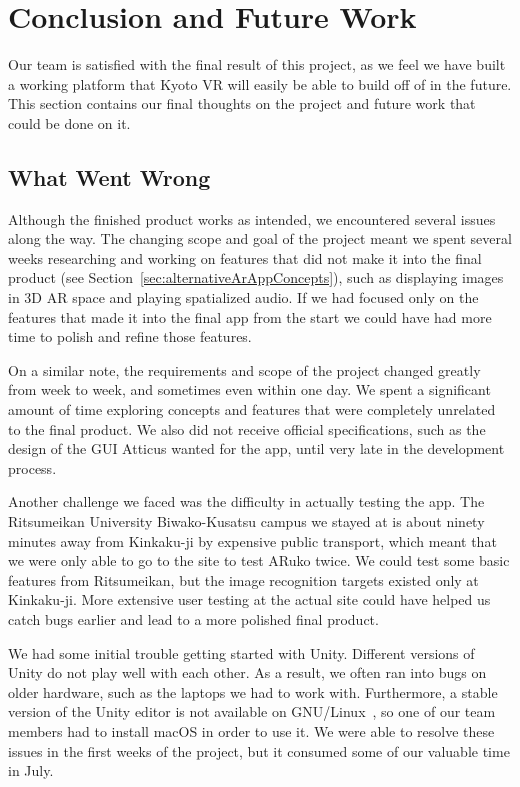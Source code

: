 \documentclass[a4paper, 10pt, american, titlepage]{article}
\begin{document}
\clearpage

\section{Conclusion and Future Work}
\label{sec:conclusionAndFutureWork}

Our team is satisfied with the final result of this project, as we feel we have
built a working platform that Kyoto VR will easily be able to build off of in
the future. This section contains our final thoughts on the project and future
work that could be done on it.

\subsection{What Went Wrong}
\label{sec:whatWentWrong}

Although the finished product works as intended, we encountered several issues
along the way. The changing scope and goal of the project meant we spent
several weeks researching and working on features that did not make it into the
final product (see Section~\ref{sec:alternativeArAppConcepts}), such as
displaying images in 3D AR space and playing spatialized audio. If we had
focused only on the features that made it into the final app from the start we
could have had more time to polish and refine those features.

On a similar note, the requirements and scope of the project changed greatly
from week to week, and sometimes even within one day. We spent a significant
amount of time exploring concepts and features that were completely unrelated to
the final product. We also did not receive official specifications, such as the
design of the GUI Atticus wanted for the app, until very late in the development
process.

Another challenge we faced was the difficulty in actually testing the app. The
Ritsumeikan University Biwako-Kusatsu campus we stayed at is about ninety
minutes away from Kinkaku-ji by expensive public transport, which meant that we
were only able to go to the site to test ARuko twice. We could test some basic
features from Ritsumeikan, but the image recognition targets existed only at
Kinkaku-ji. More extensive user testing at the actual site could have helped us
catch bugs earlier and lead to a more polished final product.

We had some initial trouble getting started with Unity. Different versions of
Unity do not play well with each other. As a result, we often ran into bugs on
older hardware, such as the laptops we had to work with. Furthermore, a stable
version of the Unity editor is not available on GNU/Linux~\autocite{best2019},
so one of our team members had to install macOS in order to use it. We were able
to resolve these issues in the first weeks of the project, but it consumed some
of our valuable time in July.
\end{document}
